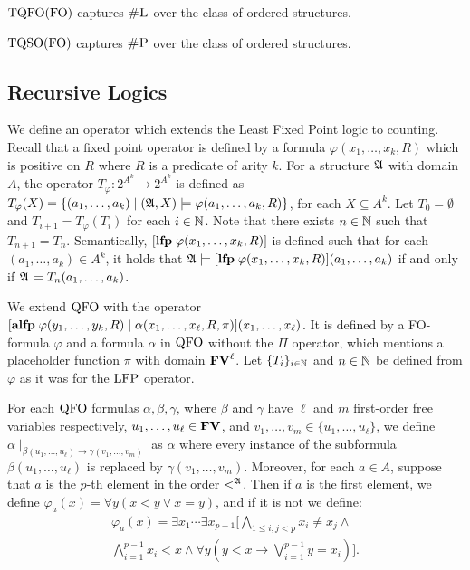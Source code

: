 \begin{theorem}
	${\rm TQFO}({\rm FO})$ captures $\text{\sc \#L}$ over the class of ordered structures.
\end{theorem}

\begin{theorem}
	${\rm TQSO}({\rm FO})$ captures $\text{\sc \#P}$ over the class of ordered structures.
\end{theorem}


\subsection{Recursive Logics}

We define an operator which extends the Least Fixed Point logic to counting. Recall that a fixed point operator is defined by a formula $\varphi(x_1,\ldots,x_k,R)$ which is positive on $R$ where $R$ is a predicate of arity $k$. For a structure $\mathfrak{A}$ with domain $A$, the operator $T_{\varphi}:2^{A^k} \to 2^{A^k}$ is defined as $T_{\varphi}(X) = \{(a_1,\ldots,a_k)\mid (\mathfrak{A},X)\models \varphi(a_1,\ldots,a_k,R) \}$, for each $X\subseteq A^k$. Let $T_0 = \emptyset$ and $T_{i+1} = T_{\varphi}(T_i)$ for each $i \in \mathbb{N}$. Note that there exists $n\in \mathbb{N}$ such that $T_{n+1} = T_n$. Semantically, $[{\bf lfp} \;\varphi(x_1,\ldots,x_k,R)]$ is defined such that for each $(a_1,\ldots,a_k)\in A^k$, it holds that $\mathfrak{A}\models[{\bf lfp} \;\varphi(x_1,\ldots,x_k,R)](a_1,\ldots,a_k)$ if and only if $\mathfrak{A}\models T_n(a_1,\ldots,a_k)$.

We extend ${\rm QFO}$ with the operator $[{\bf alfp} \;\varphi(y_1,\ldots,y_k,R)\mid\alpha(x_1,\ldots,x_{\ell},R,\pi)](x_1,\ldots,x_{\ell})$. It is defined by a FO-formula $\varphi$ and a formula $\alpha$ in ${\rm QFO}$ without the $\Pi$ operator, which mentions a placeholder function $\pi$ with domain $\mathbf{FV}^{\ell}$. Let $\{T_i\}_{i\in\mathbb{N}}$ and $n\in\mathbb{N}$ be defined from $\varphi$ as it was for the ${\rm LFP}$ operator.


For each ${\rm QFO}$ formulas $\alpha, \beta, \gamma$, where $\beta$ and $\gamma$ have $\ell$ and $m$ first-order free variables respectively, $u_1,\ldots,u_{\ell} \in \mathbf{FV}$, and $v_1,\ldots,v_m \in \{u_1,\ldots,u_{\ell}\}$, we define $\alpha\mid_{\beta(u_1,\ldots,u_{\ell})\to\gamma(v_1,\ldots,v_{m})}$ as $\alpha$ where every instance of the subformula $\beta(u_1,\ldots,u_{\ell})$ is replaced by $\gamma(v_1,\ldots,v_{m})$. Moreover, for each $a\in A$, suppose that $a$ is the $p$-th element in the order $<^{\mathfrak{A}}$. Then if $a$ is the first element, we define $\varphi_a(x) = \forall y(x < y \vee x = y)$, and if it is not we define:
\begin{multline*}
\varphi_a(x) = \exists x_1 \cdots \exists x_{p-1}[\bigwedge_{1\leq i,j < p}x_i\neq x_j \wedge\,\\ \bigwedge_{i = 1}^{p-1} x_i < x  \wedge \forall y(y < x \to \bigvee_{i = 1}^{p-1} y = x_i)].
\end{multline*}


